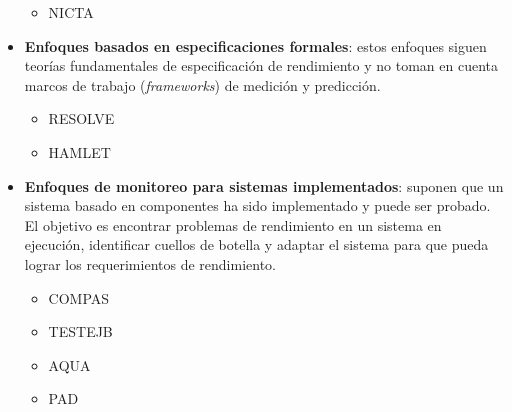 \begin{itemize}
    \begin{itemize}
        \item NICTA
    \end{itemize}
    \item \textbf{Enfoques basados en especificaciones formales}: estos enfoques siguen teorías fundamentales de especificación de rendimiento y no toman en cuenta marcos de trabajo (\emph{frameworks}) de medición y predicción.
    \begin{itemize}
        \item RESOLVE
        \item HAMLET
    \end{itemize}
    \item \textbf{Enfoques de monitoreo para sistemas implementados}: suponen que un sistema basado en componentes ha sido implementado y puede ser probado. El objetivo es encontrar problemas de rendimiento en un sistema en ejecución, identificar cuellos de botella y adaptar el sistema para que pueda lograr los requerimientos de rendimiento.
   \begin{itemize}
        \item COMPAS
        \item TESTEJB
        \item AQUA
        \item PAD
    \end{itemize}    
\end{itemize}
  

